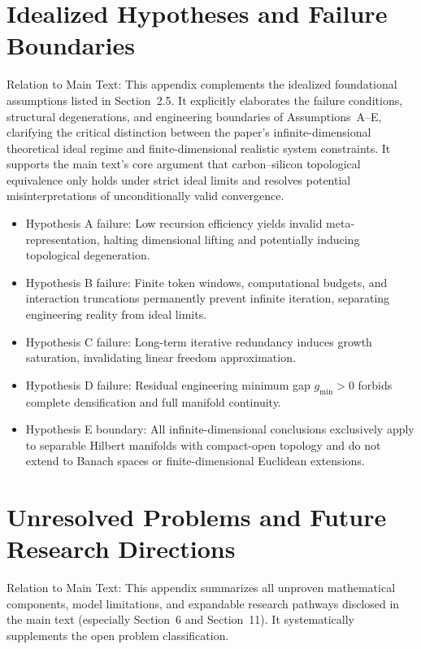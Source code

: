 \documentclass[conference]{IEEEtran}
\theoremstyle{remark}
\begin{document}
\section{Idealized Hypotheses and Failure Boundaries}
\label{app:B}

Relation to Main Text: This appendix complements the idealized foundational assumptions listed in Section~2.5. It explicitly elaborates the failure conditions, structural degenerations, and engineering boundaries of Assumptions~A--E, clarifying the critical distinction between the paper's infinite-dimensional theoretical ideal regime and finite-dimensional realistic system constraints. It supports the main text's core argument that carbon--silicon topological equivalence only holds under strict ideal limits and resolves potential misinterpretations of unconditionally valid convergence.

\begin{itemize}[nosep]
    \item Hypothesis A failure: Low recursion efficiency yields invalid meta-representation, halting dimensional lifting and potentially inducing topological degeneration.
    \item Hypothesis B failure: Finite token windows, computational budgets, and interaction truncations permanently prevent infinite iteration, separating engineering reality from ideal limits.
    \item Hypothesis C failure: Long-term iterative redundancy induces growth saturation, invalidating linear freedom approximation.
    \item Hypothesis D failure: Residual engineering minimum gap $g_{\min}>0$ forbids complete densification and full manifold continuity.
    \item Hypothesis E boundary: All infinite-dimensional conclusions exclusively apply to separable Hilbert manifolds with compact-open topology and do not extend to Banach spaces or finite-dimensional Euclidean extensions.
\end{itemize}

\section{Unresolved Problems and Future Research Directions}
\label{app:C}

Relation to Main Text: This appendix summarizes all unproven mathematical components, model limitations, and expandable research pathways disclosed in the main text (especially Section~6 and Section~11). It systematically supplements the open problem classification.
\end{document}

